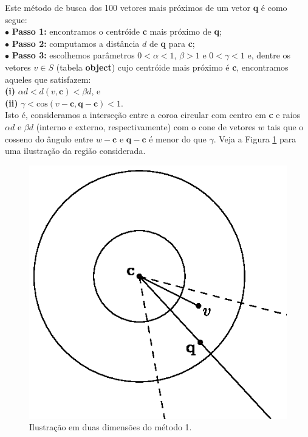 \documentclass[a4paper,12pt,titlepage]{scrartcl}
\begin{document}
Este método de busca dos 100 vetores mais próximos de um vetor \textbf{q} é como segue:\\

\noindent$\bullet$ \textbf{Passo 1:} encontramos o centróide \textbf{c} mais próximo de \textbf{q};\\

\noindent$\bullet$ \textbf{Passo 2:} computamos a distância $d$ de \textbf{q} para \textbf{c};\\

\noindent$\bullet$ \textbf{Passo 3:} escolhemos parâmetros $0 < \alpha < 1$, $\beta > 1$ e $0 < \gamma < 1$ e, dentre os vetores $v \in S$ (tabela \textbf{object}) cujo centróide mais próximo é \textbf{c}, encontramos aqueles que satisfazem:\\

\noindent\textbf{(i)} $\alpha d < d(v,\mathbf{c}) < \beta d$, e \\

\noindent\textbf{(ii)} $\gamma < \mathrm{cos}(v-\mathbf{c},\mathbf{q}-\mathbf{c}) < 1$.\\

Isto é, consideramos a interseção entre a coroa circular com centro em \textbf{c} e raios $\alpha d$ e $\beta d$ (interno e externo, respectivamente) com o cone de vetores $w$ tais que o cosseno do ângulo entre $w - \mathbf{c}$ e $\mathbf{q} - \mathbf{c}$ é menor do que $\gamma$. Veja a Figura \ref{figmetodo1} para uma ilustração da região considerada.

\begin{figure}[h]
\centering
\includegraphics{metodo1.eps}
\caption{Ilustração em duas dimensões do método 1.}
\label{figmetodo1}
\end{figure}
\end{document}
